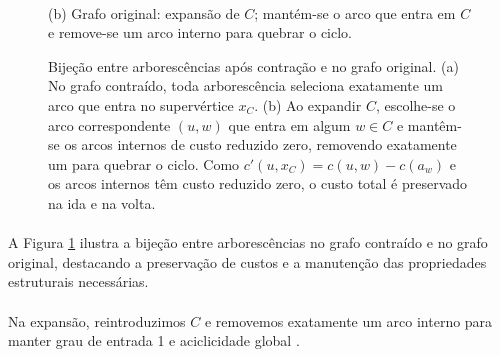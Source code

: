 \documentclass[12pt,a4paper]{article}
\begin{document}
\begin{figure}[htbp]
\begin{minipage}{.47\textwidth}
        \\[2pt]
        \small (b) Grafo original: expansão de $C$; mantém-se o arco que entra em $C$ e remove-se um arco interno para quebrar o ciclo.
    \end{minipage}
    \caption{Bijeção entre arborescências após contração e no grafo original. (a) No grafo contraído, toda arborescência seleciona exatamente um arco que entra no supervértice $x_C$. (b) Ao expandir $C$, escolhe-se o arco correspondente \((u,w)\) que entra em algum $w\in C$ e mantêm-se os arcos internos de custo reduzido zero, removendo exatamente um para quebrar o ciclo. Como $c'(u,x_C)=c(u,w)-c(a_w)$ e os arcos internos têm custo reduzido zero, o custo total é preservado na ida e na volta.}
    \label{fig:chu-liu-bijection}
\end{figure}

\paragraph{}
A Figura \ref{fig:chu-liu-bijection} ilustra a bijeção entre arborescências no grafo contraído e no grafo original, destacando a preservação de custos e a manutenção das propriedades estruturais necessárias.

\paragraph{}
Na expansão, reintroduzimos \(C\) e removemos exatamente um arco interno para manter grau de entrada 1 e aciclicidade global \cite{schrijver2003comb,kleinberg2006}.
\end{document}
